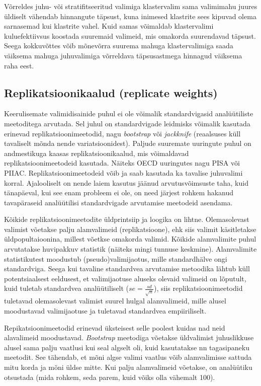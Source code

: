 \documentclass[
]{book}
\begin{document}
Võrreldes juhu- või stratifitseeritud valimiga klastervalim sama valimimahu juures üldiselt vähendab hinnangute täpsust, kuna inimesed klastrite sees kipuvad olema sarnasemad kui klastrite vahel. Kuid samas võimaldab klastervalimi kuluefektiivsus koostada suuremaid valimeid, mis omakorda suurendavad täpsust. Seega kokkuvõttes võib mõnevõrra suurema mahuga klastervalimiga saada väiksema mahuga juhuvalimiga võrreldava täpsusastmega hinnagud väiksema raha eest.

\hypertarget{replikatsioonikaalud-replicate-weights}{%
\subsection{Replikatsioonikaalud (replicate weights)}\label{replikatsioonikaalud-replicate-weights}}

Keerulisemate valimidisainide puhul ei ole võimalik standardvigasid analüütiliste meetoditega arvutada. Sel juhul on standardvigade leidmisks võimalik kasutada erinevad replikatsioonimeetodid, nagu \emph{bootstrap} või \emph{jackknife} (reaalsuses küll tavaliselt mõnda nende variatsioonidest). Paljude suuremate uuringute puhul on andmestikuga kaasas replikatsioonikaalud, mis võimaldavad replikatsioonimeetodeid kasutada. Näiteks OECD uuringutes nagu PISA või PIIAC. Replikatsioonimeetodeid võib ja saab kasutada ka tavalise juhuvalimi korral. Ajalooliselt on nende laiem kasutus jäänud arvutusvõimsuste taha, kuid tänapäeval, kui see enam probleem ei ole, on need järjest rohkem hakanud tavapäraseid analüütilisi standardvigade arvutamise meetodeid asendama.

Kõikide replikatsioonimeetodite üldprintsiip ja loogika on lihtne. Olemasolevast valimist võetakse palju alamvalimeid (replikatsioone), ehk siis valimit käsitletakse üldpopultaioonina, millest võetkse omakorda valimid. Kõikide alamvalimite puhul arvutatakse huvipakkuv statistik (näiteks mingi tunnuse keskmine). Alamvalimite statistikutest moodustub (pseudo)valimijaotus, mille standardhälve ongi standardviga. Seega kui tavaline standardvea arvutamise metoodika lähtub küll potentsiaalsest eeldusest, et valimijaotuse aluseks olevaid valimeid on lõputult, kuid tuletab standardvea analüütiliselt (\(se = \frac{sd}{\sqrt{n}}\)), siis replikatsioonimeetodid tuletavad olemasolevast valimist suurel hulgal alamvalimeid, mille alusel moodustavad valimijaotuse ja tuletavad standardvea empiiriliselt.

Repikatsioonimeetodid erinevad üksteisest selle poolest kuidas nad neid alavalimeid moodustavad. \emph{Bootstrap} meetodiga võetakse üldvalimist juhuslikkuse alusel sama palju vaatlusi kui seal algselt oli, kuid kasutatakse nn tagasipaneku meetodit. See tähendab, et mõni algse valimi vaatlus võib alamvalimisse sattuda mitu korda ja mõni üldse mitte. Kui palju alamvalimeid võetakse, on analüütiku otsustada (mida rohkem, seda parem, kuid võiks olla vähemalt 100).
\end{document}
